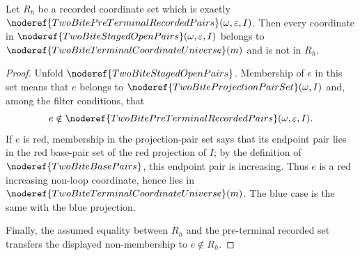 \begin{helper}
Let \(R_h\) be a recorded coordinate set which is exactly
\(\noderef{TwoBitePreTerminalRecordedPairs}(\omega,\varepsilon,I)\).  Then
every coordinate in
\(\noderef{TwoBiteStagedOpenPairs}(\omega,\varepsilon,I)\) belongs to
\(\noderef{TwoBiteTerminalCoordinateUniverse}(m)\) and is not in \(R_h\).
\end{helper}
\begin{proof}
Unfold \(\noderef{TwoBiteStagedOpenPairs}\).  Membership of \(e\) in this set
means that \(e\) belongs to \(\noderef{TwoBiteProjectionPairSet}(\omega,I)\)
and, among the filter conditions, that
\[
e\notin\noderef{TwoBitePreTerminalRecordedPairs}(\omega,\varepsilon,I).
\]
If \(e\) is red, membership in the projection-pair set says that its endpoint
pair lies in the red base-pair set of the red projection of \(I\); by the
definition of \(\noderef{TwoBiteBasePairs}\), this endpoint pair is increasing.
Thus \(e\) is a red increasing non-loop coordinate, hence lies in
\(\noderef{TwoBiteTerminalCoordinateUniverse}(m)\).  The blue case is the
same with the blue projection.

Finally, the assumed equality between \(R_h\) and the pre-terminal recorded
set transfers the displayed non-membership to \(e\notin R_h\).
\end{proof}
